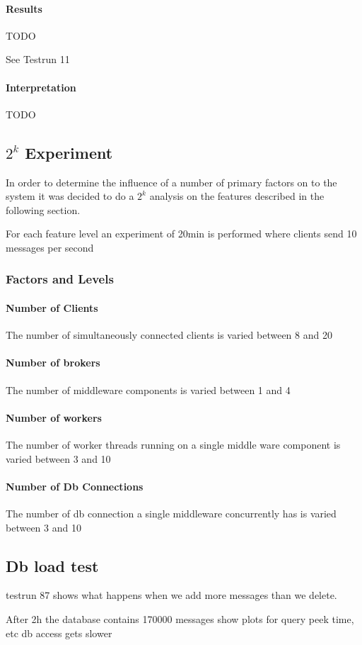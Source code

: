 \documentclass[milestone1.tex]{subfiles}
\begin{document}
\paragraph{Results}

TODO

See Testrun 11


\paragraph{Interpretation}

TODO

\subsection{$2^k$ Experiment}
In order to determine the influence of a number of primary factors on to the system it was decided to do a $2^k$ analysis on the features described in the following section.

For each feature level an experiment of 20min is performed where clients send 10 messages per second

\subsubsection{Factors and Levels}

\paragraph{Number of Clients}
The number of simultaneously connected clients is varied between 8 and 20

\paragraph{Number of brokers}

The number of middleware components is varied between 1 and 4
\paragraph{Number of workers}

The number of worker threads running on a single middle ware component is varied between 3 and 10

\paragraph{Number of Db Connections}

The number of db connection a single middleware concurrently has is varied between 3 and 10

\subsection{Db load test}


testrun 87 shows what happens when we add more messages than we delete. 

After 2h the database contains 170000 messages
show plots for query peek time, etc
db access gets slower
\end{document}
